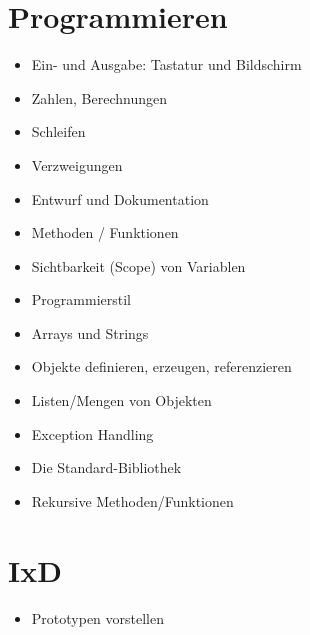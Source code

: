 \documentclass[a4paper]{scrartcl}
\begin{document}
    \section{Programmieren}
        \begin{itemize}
            \item Ein- und Ausgabe: Tastatur und Bildschirm
            \item Zahlen, Berechnungen
            \item Schleifen
            \item Verzweigungen
            \item Entwurf und Dokumentation
            \item Methoden / Funktionen
            \item Sichtbarkeit (Scope) von Variablen
            \item Programmierstil
            \item Arrays und Strings
            \item Objekte definieren, erzeugen, referenzieren
            \item Listen/Mengen von Objekten
            \item Exception Handling
            \item Die Standard-Bibliothek
            \item Rekursive Methoden/Funktionen
        \end{itemize}
    \section{IxD}
        \begin{itemize}
            \item Prototypen vorstellen
        \end{itemize}
\end{document}
